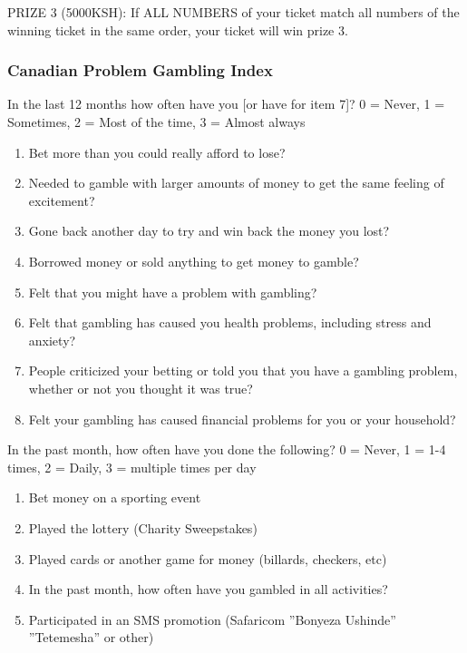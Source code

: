 \documentclass[11pt]{article}
\begin{document}
            PRIZE 3 (5000KSH): If ALL NUMBERS of your ticket match all numbers of the winning ticket in the same order, your ticket will win prize 3.

        \subsubsection{Canadian Problem Gambling Index}

        In the last 12 months how often have you [or have for item 7]? 0 = Never, 1 = Sometimes, 2 = Most of the time, 3 = Almost always

        \begin{enumerate}
            \item Bet more than you could really afford to lose?
        	\item Needed to gamble with larger amounts of money to get the same feeling of excitement?
        	\item Gone back another day to try and win back the money you lost?
        	\item Borrowed money or sold anything to get money to gamble?
        	\item Felt that you might have a problem with gambling?
        	\item Felt that gambling has caused you health problems, including stress and anxiety?
        	\item People criticized your betting or told you that you have a gambling problem, whether or not you thought it was true?
        	\item Felt your gambling has caused financial problems for you or your household?
        \end{enumerate}

        In the past month, how often have you done the following? 0 = Never, 1 = 1-4 times, 2 = Daily, 3 = multiple times per day

        \begin{enumerate}
        	\item Bet money on a sporting event
        	\item Played the lottery (Charity Sweepstakes)
        	\item Played cards or another game for money (billards, checkers, etc)
        	\item In the past month, how often have you gambled in all activities?
        	\item Participated in an SMS promotion (Safaricom ''Bonyeza Ushinde'' ''Tetemesha'' or other)
        \end{enumerate}
\end{document}
